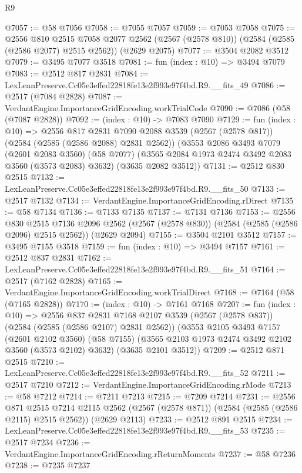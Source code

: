 \begin{lexlean}{R9}
\begin{coremodule}
@7057 := @58 @7056
@7058 := @7055 @7057
@7059 := @7053 @7058
@7075 := @2556
    @810
    @2515
    @7058
    @2077
    @2562
    (@2567 (@2578 @810))
    (@2584 (@2585 (@2586 @2077) @2515 @2562))
    (@2629 @2075)
@7077 := @3504 @2082 @3512
@7079 := @3495 @7077 @3518
@7081 := fun (index : @10) => @3494 @7079
@7083 := @2512 @817 @2831
@7084 := LexLeanPreserve.Cc05e3effed22818fe13e2f993e97f4bd.R9.__fits_49
@7086 := @2517 (@7084 @2828)
@7087 := VerdantEngine.ImportanceGridEncoding.workTrialCode
@7090 := @7086 (@58 (@7087 @2828))
@7092 := (index : @10) -> @7083 @7090
@7129 := fun (index : @10) =>
  @2556
    @817
    @2831
    @7090
    @2088
    @3539
    (@2567 (@2578 @817))
    (@2584 (@2585 (@2586 @2088) @2831 @2562))
    (@3553
      @2086
      @3493
      @7079
      (@2601 @2083 @3560)
      (@58 @7077)
      (@3565 @2084 @1973 @2474 @3492 @2083 @3560 (@3573 @2083) @3632)
      (@3635 @2082 @3512))
@7131 := @2512 @830 @2515
@7132 := LexLeanPreserve.Cc05e3effed22818fe13e2f993e97f4bd.R9.__fits_50
@7133 := @2517 @7132
@7134 := VerdantEngine.ImportanceGridEncoding.rDirect
@7135 := @58 @7134
@7136 := @7133 @7135
@7137 := @7131 @7136
@7153 := @2556
    @830
    @2515
    @7136
    @2096
    @2562
    (@2567 (@2578 @830))
    (@2584 (@2585 (@2586 @2096) @2515 @2562))
    (@2629 @2094)
@7155 := @3504 @2101 @3512
@7157 := @3495 @7155 @3518
@7159 := fun (index : @10) => @3494 @7157
@7161 := @2512 @837 @2831
@7162 := LexLeanPreserve.Cc05e3effed22818fe13e2f993e97f4bd.R9.__fits_51
@7164 := @2517 (@7162 @2828)
@7165 := VerdantEngine.ImportanceGridEncoding.workTrialDirect
@7168 := @7164 (@58 (@7165 @2828))
@7170 := (index : @10) -> @7161 @7168
@7207 := fun (index : @10) =>
  @2556
    @837
    @2831
    @7168
    @2107
    @3539
    (@2567 (@2578 @837))
    (@2584 (@2585 (@2586 @2107) @2831 @2562))
    (@3553
      @2105
      @3493
      @7157
      (@2601 @2102 @3560)
      (@58 @7155)
      (@3565 @2103 @1973 @2474 @3492 @2102 @3560 (@3573 @2102) @3632)
      (@3635 @2101 @3512))
@7209 := @2512 @871 @2515
@7210 := LexLeanPreserve.Cc05e3effed22818fe13e2f993e97f4bd.R9.__fits_52
@7211 := @2517 @7210
@7212 := VerdantEngine.ImportanceGridEncoding.rMode
@7213 := @58 @7212
@7214 := @7211 @7213
@7215 := @7209 @7214
@7231 := @2556
    @871
    @2515
    @7214
    @2115
    @2562
    (@2567 (@2578 @871))
    (@2584 (@2585 (@2586 @2115) @2515 @2562))
    (@2629 @2113)
@7233 := @2512 @891 @2515
@7234 := LexLeanPreserve.Cc05e3effed22818fe13e2f993e97f4bd.R9.__fits_53
@7235 := @2517 @7234
@7236 := VerdantEngine.ImportanceGridEncoding.rReturnMoments
@7237 := @58 @7236
@7238 := @7235 @7237

\end{coremodule}
\end{lexlean}
